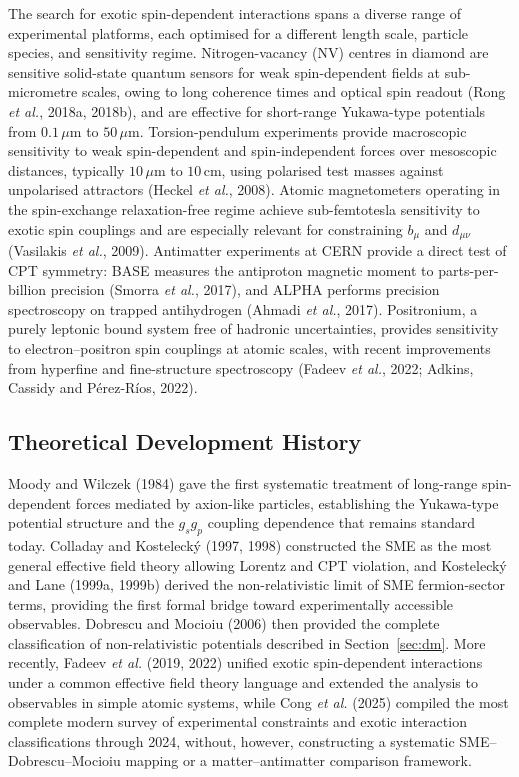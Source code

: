 The search for exotic spin-dependent interactions spans a diverse range of
experimental platforms, each optimised for a different length scale,
particle species, and sensitivity regime. Nitrogen-vacancy (NV) centres in
diamond are sensitive solid-state quantum sensors for weak spin-dependent
fields at sub-micrometre scales, owing to long coherence times and optical
spin readout (Rong \textit{et al.}, 2018a, 2018b), and are effective for
short-range Yukawa-type potentials from $0.1\,\mu\mathrm{m}$ to
$50\,\mu\mathrm{m}$. Torsion-pendulum experiments provide macroscopic
sensitivity to weak spin-dependent and spin-independent forces over
mesoscopic distances, typically $10\,\mu\mathrm{m}$ to $10\,\mathrm{cm}$,
using polarised test masses against unpolarised attractors (Heckel
\textit{et al.}, 2008). Atomic magnetometers operating in the
spin-exchange relaxation-free regime achieve sub-femtotesla sensitivity to
exotic spin couplings and are especially relevant for constraining $b_\mu$
and $d_{\mu\nu}$ (Vasilakis \textit{et al.}, 2009). Antimatter experiments
at CERN provide a direct test of CPT symmetry: BASE measures the antiproton
magnetic moment to parts-per-billion precision (Smorra \textit{et al.},
2017), and ALPHA performs precision spectroscopy on trapped antihydrogen
(Ahmadi \textit{et al.}, 2017). Positronium, a purely leptonic bound
system free of hadronic uncertainties, provides sensitivity to
electron--positron spin couplings at atomic scales, with recent
improvements from hyperfine and fine-structure spectroscopy (Fadeev
\textit{et al.}, 2022; Adkins, Cassidy and Pérez-Ríos, 2022).

\subsection{Theoretical Development History}

Moody and Wilczek (1984) gave the first systematic treatment of long-range
spin-dependent forces mediated by axion-like particles, establishing the
Yukawa-type potential structure and the $g_sg_p$ coupling dependence that
remains standard today. Colladay and Kostelecký (1997, 1998) constructed
the SME as the most general effective field theory allowing Lorentz and CPT
violation, and Kostelecký and Lane (1999a, 1999b) derived the non-relativistic
limit of SME fermion-sector terms, providing the first formal bridge
toward experimentally accessible observables. Dobrescu and Mocioiu (2006)
then provided the complete classification of non-relativistic potentials
described in Section~\ref{sec:dm}. More recently, Fadeev \textit{et al.}
(2019, 2022) unified exotic spin-dependent interactions under a common
effective field theory language and extended the analysis to observables in
simple atomic systems, while Cong \textit{et al.} (2025) compiled the most
complete modern survey of experimental constraints and exotic interaction
classifications through 2024, without, however, constructing a systematic
SME--Dobrescu--Mocioiu mapping or a matter--antimatter comparison
framework.

